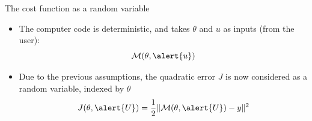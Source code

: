 \documentclass[10pt,aspectratio=169,usepdftitle=false]{beamer}
\newcommand{\yobs}{y}
\newcommand{\kk}{\theta}
\newcommand{\uu}{u}
\newcommand{\UU}{U}
\begin{document}
\begin{frame}{The cost function as a random variable}
  \begin{itemize}
  \item The computer code is deterministic, and takes $\kk$ and $\uu$
    as inputs (from the user):
    \begin{equation*}
      \mathcal{M}(\kk,\alert{\uu})
    \end{equation*}
  \item Due to the previous assumptions, the quadratic error $J$ is
    now considered as a random variable, indexed by $\kk$
    \begin{equation*}
      J(\kk,\alert{\UU}) =  \frac12\|\mathcal{M}(\kk,\alert{\UU}) - \yobs\|^2
    \end{equation*}
  \end{itemize}

\end{frame}
\end{document}
